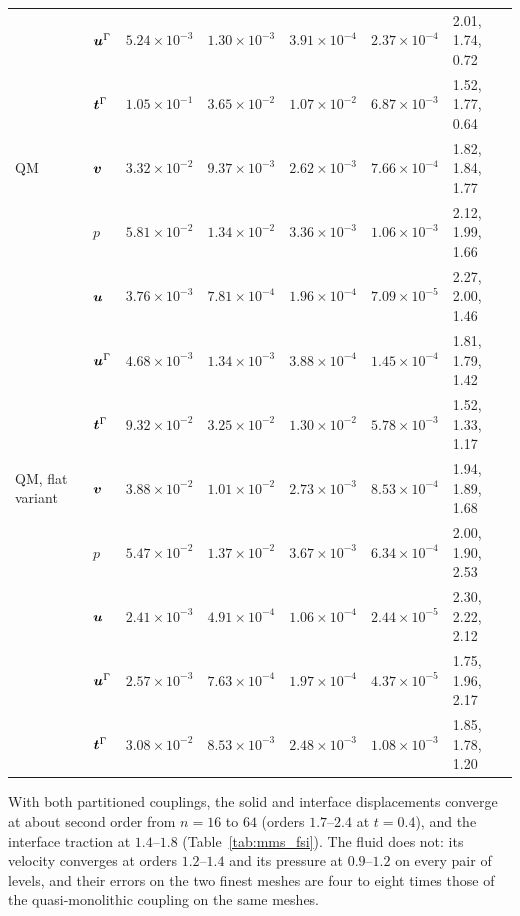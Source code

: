 \begin{table}[htbp]
\begin{tabular}{llrrrrl}
		 & $\boldsymbol{u}^\Gamma$ & $5.24\times10^{-3}$ & $1.30\times10^{-3}$ & $3.91\times10^{-4}$ & $2.37\times10^{-4}$ & 2.01, 1.74, 0.72 \\
		 & $\boldsymbol{t}^\Gamma$ & $1.05\times10^{-1}$ & $3.65\times10^{-2}$ & $1.07\times10^{-2}$ & $6.87\times10^{-3}$ & 1.52, 1.77, 0.64 \\
		\midrule
		QM & $\boldsymbol{v}$ & $3.32\times10^{-2}$ & $9.37\times10^{-3}$ & $2.62\times10^{-3}$ & $7.66\times10^{-4}$ & 1.82, 1.84, 1.77 \\
		 & $p$ & $5.81\times10^{-2}$ & $1.34\times10^{-2}$ & $3.36\times10^{-3}$ & $1.06\times10^{-3}$ & 2.12, 1.99, 1.66 \\
		 & $\boldsymbol{u}$ & $3.76\times10^{-3}$ & $7.81\times10^{-4}$ & $1.96\times10^{-4}$ & $7.09\times10^{-5}$ & 2.27, 2.00, 1.46 \\
		 & $\boldsymbol{u}^\Gamma$ & $4.68\times10^{-3}$ & $1.34\times10^{-3}$ & $3.88\times10^{-4}$ & $1.45\times10^{-4}$ & 1.81, 1.79, 1.42 \\
		 & $\boldsymbol{t}^\Gamma$ & $9.32\times10^{-2}$ & $3.25\times10^{-2}$ & $1.30\times10^{-2}$ & $5.78\times10^{-3}$ & 1.52, 1.33, 1.17 \\
		\midrule
		QM, flat variant & $\boldsymbol{v}$ & $3.88\times10^{-2}$ & $1.01\times10^{-2}$ & $2.73\times10^{-3}$ & $8.53\times10^{-4}$ & 1.94, 1.89, 1.68 \\
		 & $p$ & $5.47\times10^{-2}$ & $1.37\times10^{-2}$ & $3.67\times10^{-3}$ & $6.34\times10^{-4}$ & 2.00, 1.90, 2.53 \\
		 & $\boldsymbol{u}$ & $2.41\times10^{-3}$ & $4.91\times10^{-4}$ & $1.06\times10^{-4}$ & $2.44\times10^{-5}$ & 2.30, 2.22, 2.12 \\
		 & $\boldsymbol{u}^\Gamma$ & $2.57\times10^{-3}$ & $7.63\times10^{-4}$ & $1.97\times10^{-4}$ & $4.37\times10^{-5}$ & 1.75, 1.96, 2.17 \\
		 & $\boldsymbol{t}^\Gamma$ & $3.08\times10^{-2}$ & $8.53\times10^{-3}$ & $2.48\times10^{-3}$ & $1.08\times10^{-3}$ & 1.85, 1.78, 1.20 \\
		\bottomrule
	\end{tabular}
\end{table}
With both partitioned couplings, the solid and interface displacements converge at about second order from $n = 16$ to $64$ (orders $1.7$--$2.4$ at $t = 0.4$), and the interface traction at $1.4$--$1.8$ (Table~\ref{tab:mms_fsi}).
The fluid does not: its velocity converges at orders $1.2$--$1.4$ and its pressure at $0.9$--$1.2$ on every pair of levels, and their errors on the two finest meshes are four to eight times those of the quasi-monolithic coupling on the same meshes.
